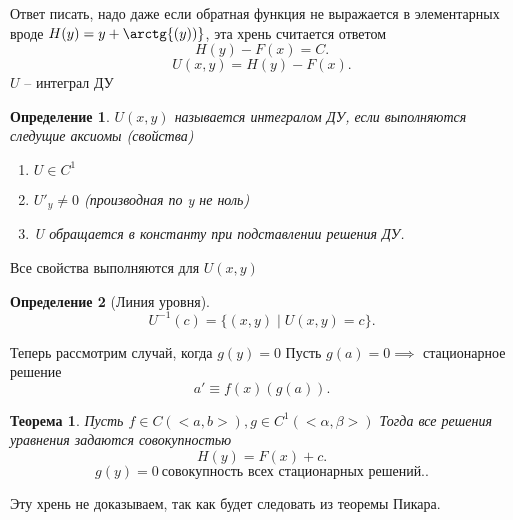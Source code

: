 \documentclass[14pt]{extarticle}
\newtheorem{theorem}{Теорема}
\newtheorem{definition}{Определение}
\begin{document}
Ответ писать, надо даже если обратная функция не выражается в элементарных вроде $H(y) = y + \arctg{(y))}$, эта хрень считается ответом
\[
H(y) - F(x) = C
.\] 
\[
U(x,y) = H(y) - F(x)
.\] 
$U$ -- интеграл ДУ
\begin{definition}
    $U(x,y)$ называется интегралом ДУ, если выполняются следущие аксиомы (свойства)
    \begin{enumerate}
        \item $U \in C^{1}$ 
        \item $U'_{y} \neq 0$ (производная по y не ноль)
        \item U обращается в константу при подставлении решения ДУ.
    \end{enumerate}
\end{definition}
Все свойства выполняются для $U(x,y)$
\begin{definition}[Линия уровня]
    \[
        U^{-1}(c) = \{(x,y) \mid U(x,y) = c\}
    .\] 
\end{definition}
Теперь рассмотрим случай, когда $g(y) = 0$
Пусть  $g(a) = 0 \implies$ стационарное решение
 \[
a' \equiv f(x)(g(a))
.\] 
\begin{theorem}
    Пусть $f \in C(<a,b>), g \in C^{1}(<\alpha,\beta>)$
     Тогда все решения уравнения задаются совокупностью
     \[
     H(y) = F(x) + c
     .\] 
     \[
         g(y) = 0 ~\text{совокупность всех стационарных решений.}
     .\] 
\end{theorem}
Эту хрень не доказываем, так как будет следовать из теоремы Пикара.
\end{document}
